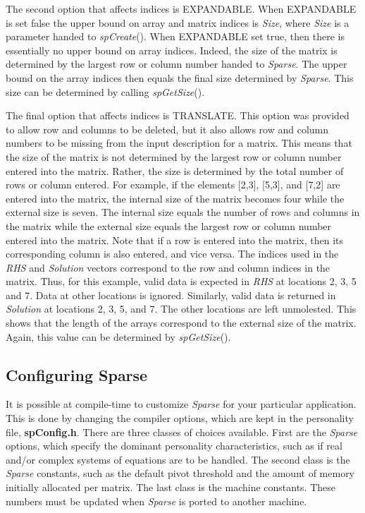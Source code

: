 \documentclass[11pt]{article}
\begin{document}
The second option that affects indices is EXPANDABLE.  When EXPANDABLE
is set false the upper bound on array and matrix indices is \emph{Size},
where \emph{Size} is a parameter handed to \emph{spCreate}().  When
EXPANDABLE set true, then there is essentially no upper bound on array
indices.  Indeed, the size of the matrix is determined by the largest
row or column number handed to \emph{Sparse}.  The upper bound on the
array indices then equals the final size determined by \emph{Sparse}.
This size can be determined by calling \emph{spGetSize}().

The final option that affects indices is TRANSLATE.  This option was
provided to allow row and columns to be deleted, but it also allows row
and column numbers to be missing from the input description for a
matrix.  This means that the size of the matrix is not determined by
the largest row or column number entered into the matrix.  Rather, the
size is determined by the total number of rows or column entered.  For
example, if the elements [2,3], [5,3], and [7,2] are entered into the
matrix, the internal size of the matrix becomes four while the external
size is seven.  The internal size equals the number of rows and columns
in the matrix while the external size equals the largest row or column
number entered into the matrix.  Note that if a row is entered into the
matrix, then its corresponding column is also entered, and vice versa.
The indices used in the \emph{RHS} and \emph{Solution} vectors
correspond to the row and column indices in the matrix.  Thus, for this
example, valid data is expected in \emph{RHS} at locations 2, 3, 5
and 7.  Data at other locations is ignored.  Similarly, valid data is
returned in \emph{Solution} at locations 2, 3, 5, and 7.  The other
locations are left unmolested.  This shows that the length of the
arrays correspond to the external size of the matrix.  Again, this
value can be determined by \emph{spGetSize}().

\subsection{Configuring Sparse}
It is possible at compile-time to customize \emph{Sparse} for your
particular application.  This is done by changing the compiler options,
which are kept in the personality file, {\bf spConfig.h}.  There are
three classes of choices available.  First are the \emph{Sparse} options,
which specify the dominant personality characteristics, such as if real
and/or complex systems of equations are to be handled.  The second
class is the \emph{Sparse} constants, such as the default pivot threshold and
the amount of memory initially allocated per matrix.  The last class is
the machine constants.  These numbers must be updated when \emph{Sparse}
is ported to another machine.
\end{document}
